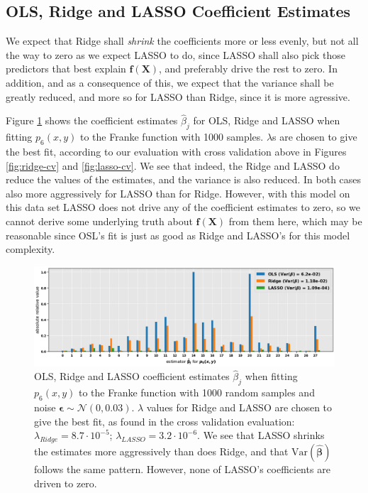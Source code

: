 \documentclass[]{article}
\begin{document}
\subsection{OLS, Ridge and LASSO Coefficient Estimates}
We expect that Ridge shall \textit{shrink} the coefficients more or less evenly, but not all the way to zero as we expect LASSO to do, since LASSO shall also pick those predictors that best explain $\mathbf{f}(\mathbf{X})$, and preferably drive the rest to zero. In addition, and as a consequence of this, we expect that the variance shall be greatly reduced, and more so for LASSO than Ridge, since it is more agressive. 

Figure \ref{fig:ols-ridge-lasso-betas} shows the coefficient estimates $\hat{\beta}_j$ for OLS, Ridge and LASSO when fitting $p_6(x,y)$ to the Franke function with 1000 samples. $\lambda$s are chosen to give the best fit, according to our evaluation with cross validation above in Figures \ref{fig:ridge-cv} and \ref{fig:lasso-cv}. We see that indeed, the Ridge and LASSO do reduce the values of the estimates, and the variance is also reduced. In both cases also more aggressively for LASSO than for Ridge. However, with this model on this data set LASSO does not drive any of the coefficient estimates to zero, so we cannot derive some underlying truth about $\mathbf{f}(\mathbf{X})$ from them here, which may be reasonable since OSL's fit is just as good as Ridge and LASSO's for this model complexity.

\begin{figure}[!htb]
	\centering
	\includegraphics[width=1\linewidth]{./results/ols-ridge-lasso-betas.png}
	\caption{OLS, Ridge and LASSO coefficient estimates $\hat{\beta}_j$ when fitting $p_6(x,y)$ to the Franke function with 1000 random samples and noise $\mathbf{\epsilon} \sim \mathcal{N}(0, 0.03)$. $\lambda$ values for Ridge and LASSO are chosen to give the best fit, as found in the cross validation evaluation: $\lambda_{Ridge} = 8.7 \cdot 10^{-5}$; $\lambda_{LASSO} = 3.2 \cdot 10^{-6}$. We see that LASSO shrinks the estimates more aggressively than does Ridge, and that $\mathrm{Var}(\mathbf{\hat{\beta}})$ follows the same pattern. However, none of LASSO's coefficients are driven to zero.}
	\label{fig:ols-ridge-lasso-betas}
\end{figure}
\end{document}
